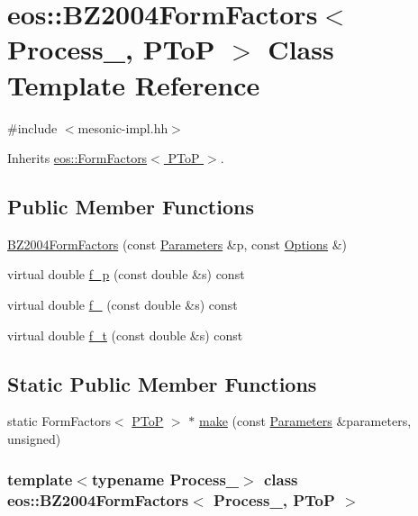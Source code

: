 \hypertarget{classeos_1_1BZ2004FormFactors_3_01Process___00_01PToP_01_4}{
\section{eos::BZ2004FormFactors$<$ Process\_\-, PToP $>$ Class Template Reference}
\label{classeos_1_1BZ2004FormFactors_3_01Process___00_01PToP_01_4}
}


{\ttfamily \#include $<$mesonic-\/impl.hh$>$}

Inherits \hyperlink{classeos_1_1FormFactors_3_01PToP_01_4}{eos::FormFactors$<$ PToP $>$}.\subsection*{Public Member Functions}
\begin{DoxyCompactItemize}
\item 
\hyperlink{classeos_1_1BZ2004FormFactors_3_01Process___00_01PToP_01_4_abfc24e63dc1d845b0a4996bea251b478}{BZ2004FormFactors} (const \hyperlink{classeos_1_1Parameters}{Parameters} \&p, const \hyperlink{classeos_1_1Options}{Options} \&)
\item 
virtual double \hyperlink{classeos_1_1BZ2004FormFactors_3_01Process___00_01PToP_01_4_aa8cda87a04cbfced508534de89f95e7d}{f\_\-p} (const double \&s) const 
\item 
virtual double \hyperlink{classeos_1_1BZ2004FormFactors_3_01Process___00_01PToP_01_4_a9a3225d30afba82d87ca09b4ce5565f5}{f\_} (const double \&s) const 
\item 
virtual double \hyperlink{classeos_1_1BZ2004FormFactors_3_01Process___00_01PToP_01_4_a1721a47e9e515d8301e0611cb82398aa}{f\_\-t} (const double \&s) const 
\end{DoxyCompactItemize}
\subsection*{Static Public Member Functions}
\begin{DoxyCompactItemize}
\item 
static FormFactors$<$ \hyperlink{structeos_1_1PToP}{PToP} $>$ $\ast$ \hyperlink{classeos_1_1BZ2004FormFactors_3_01Process___00_01PToP_01_4_a8840441ed8292da6d6728cea0ac2692e}{make} (const \hyperlink{classeos_1_1Parameters}{Parameters} \&parameters, unsigned)
\end{DoxyCompactItemize}
\subsubsection*{template$<$typename Process\_\-$>$ class eos::BZ2004FormFactors$<$ Process\_\-, PToP $>$}



